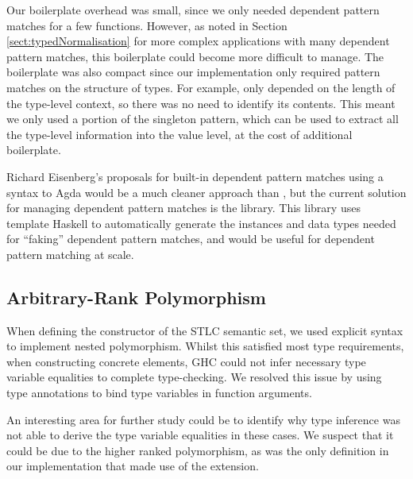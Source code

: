 Our boilerplate overhead was small, since we only needed dependent pattern matches for a few functions. However, as noted in Section \ref{sect:typedNormalisation} for more complex applications with many dependent pattern matches, this boilerplate could become more difficult to manage. The boilerplate was also compact since our implementation only required pattern matches on the structure of types. For example,  only depended on the length of the type-level context, so there was no need to identify its contents. This meant we only used a portion of the singleton pattern, which can be used to extract all the type-level information into the value level, at the cost of additional boilerplate.

Richard Eisenberg's proposals for built-in dependent pattern matches using a syntax to Agda would be a much cleaner approach than , but the current solution for managing dependent pattern matches is the  library. This library uses template Haskell to automatically generate the instances and data types needed for “faking” dependent pattern matches, and would be useful for dependent pattern matching at scale.

\subsection{Arbitrary-Rank Polymorphism}

When defining the  constructor of the STLC semantic set, we used explicit  syntax to implement nested polymorphism. Whilst this satisfied most type requirements, when constructing concrete  elements, GHC could not infer necessary type variable equalities to complete type-checking. We resolved this issue by using type annotations to bind type variables in function arguments. 

An interesting area for further study could be to identify why type inference was not able to derive the type variable equalities in these cases. We suspect that it could be due to the higher ranked polymorphism, as  was the only definition in our implementation that made use of the  extension.

